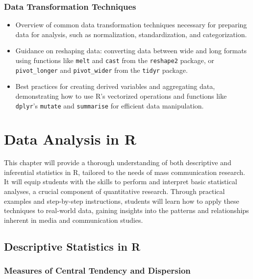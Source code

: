 \documentclass[
]{book}
\begin{document}
\hypertarget{data-transformation-techniques}{%
\subsection*{Data Transformation Techniques}\label{data-transformation-techniques}}

\begin{itemize}
\item
  Overview of common data transformation techniques necessary for preparing data for analysis, such as normalization, standardization, and categorization.
\item
  Guidance on reshaping data: converting data between wide and long formats using functions like \texttt{melt} and \texttt{cast} from the \texttt{reshape2} package, or \texttt{pivot\_longer} and \texttt{pivot\_wider} from the \texttt{tidyr} package.
\item
  Best practices for creating derived variables and aggregating data, demonstrating how to use R's vectorized operations and functions like \texttt{dplyr}'s \texttt{mutate} and \texttt{summarise} for efficient data manipulation.
\end{itemize}

\hypertarget{data-analysis-in-r}{%
\chapter{Data Analysis in R}\label{data-analysis-in-r}}

This chapter will provide a thorough understanding of both descriptive and inferential statistics in R, tailored to the needs of mass communication research. It will equip students with the skills to perform and interpret basic statistical analyses, a crucial component of quantitative research. Through practical examples and step-by-step instructions, students will learn how to apply these techniques to real-world data, gaining insights into the patterns and relationships inherent in media and communication studies.

\hypertarget{descriptive-statistics-in-r}{%
\section*{Descriptive Statistics in R}\label{descriptive-statistics-in-r}}

\hypertarget{measures-of-central-tendency-and-dispersion}{%
\subsection*{Measures of Central Tendency and Dispersion}\label{measures-of-central-tendency-and-dispersion}}
\end{document}
